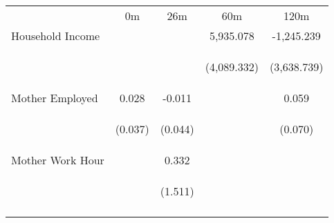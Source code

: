 \begin{tabular}{lcccc}
\hline \noalign{\smallskip} & 0m & 26m & 60m & 120m\\
\noalign{\smallskip}\hline \noalign{\smallskip}Household Income &  &  & 5,935.078 & -1,245.239\\
 & \begin{footnotesize}\end{footnotesize} & \begin{footnotesize}\end{footnotesize} & \begin{footnotesize}(4,089.332)\end{footnotesize} & \begin{footnotesize}(3,638.739)\end{footnotesize}\\
\noalign{\smallskip}Mother Employed & 0.028 & -0.011 &  & 0.059\\
 & \begin{footnotesize}(0.037)\end{footnotesize} & \begin{footnotesize}(0.044)\end{footnotesize} & \begin{footnotesize}\end{footnotesize} & \begin{footnotesize}(0.070)\end{footnotesize}\\
\noalign{\smallskip}Mother Work Hour &  & 0.332 &  & \\
 & \begin{footnotesize}\end{footnotesize} & \begin{footnotesize}(1.511)\end{footnotesize} & \begin{footnotesize}\end{footnotesize} & \begin{footnotesize}\end{footnotesize}\\
\noalign{\smallskip}\hline\end{tabular}\\
